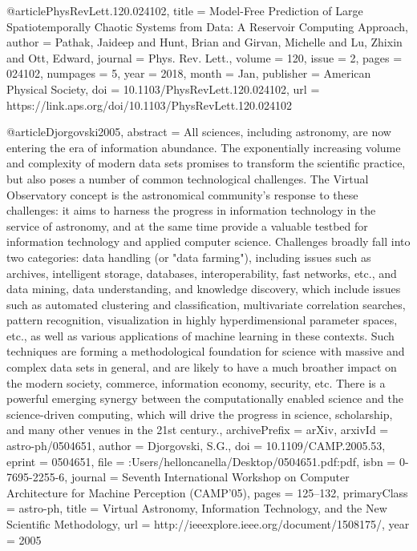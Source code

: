 @article{PhysRevLett.120.024102,
  title = {Model-Free Prediction of Large Spatiotemporally Chaotic Systems from Data: A Reservoir Computing Approach},
  author = {Pathak, Jaideep and Hunt, Brian and Girvan, Michelle and Lu, Zhixin and Ott, Edward},
  journal = {Phys. Rev. Lett.},
  volume = {120},
  issue = {2},
  pages = {024102},
  numpages = {5},
  year = {2018},
  month = {Jan},
  publisher = {American Physical Society},
  doi = {10.1103/PhysRevLett.120.024102},
  url = {https://link.aps.org/doi/10.1103/PhysRevLett.120.024102}
}


@article{Djorgovski2005,
abstract = {All sciences, including astronomy, are now entering the era of information abundance. The exponentially increasing volume and complexity of modern data sets promises to transform the scientific practice, but also poses a number of common technological challenges. The Virtual Observatory concept is the astronomical community's response to these challenges: it aims to harness the progress in information technology in the service of astronomy, and at the same time provide a valuable testbed for information technology and applied computer science. Challenges broadly fall into two categories: data handling (or "data farming"), including issues such as archives, intelligent storage, databases, interoperability, fast networks, etc., and data mining, data understanding, and knowledge discovery, which include issues such as automated clustering and classification, multivariate correlation searches, pattern recognition, visualization in highly hyperdimensional parameter spaces, etc., as well as various applications of machine learning in these contexts. Such techniques are forming a methodological foundation for science with massive and complex data sets in general, and are likely to have a much broather impact on the modern society, commerce, information economy, security, etc. There is a powerful emerging synergy between the computationally enabled science and the science-driven computing, which will drive the progress in science, scholarship, and many other venues in the 21st century.},
archivePrefix = {arXiv},
arxivId = {astro-ph/0504651},
author = {Djorgovski, S.G.},
doi = {10.1109/CAMP.2005.53},
eprint = {0504651},
file = {:Users/helloncanella/Desktop/0504651.pdf:pdf},
isbn = {0-7695-2255-6},
journal = {Seventh International Workshop on Computer Architecture for Machine Perception (CAMP'05)},
pages = {125--132},
primaryClass = {astro-ph},
title = {{Virtual Astronomy, Information Technology, and the New Scientific Methodology}},
url = {http://ieeexplore.ieee.org/document/1508175/},
year = {2005}
}


